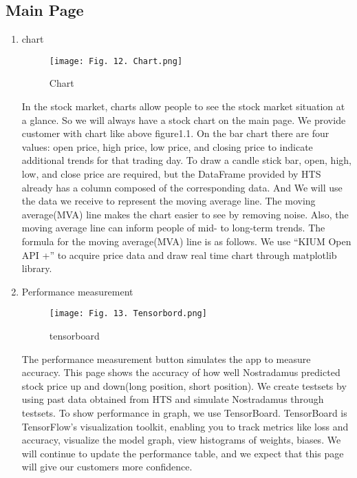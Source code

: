 \documentclass[conference]{IEEEtran}
\begin{document}
\subsection{Main Page}


\begin{enumerate}

 \item chart
    \begin{figure}[h]
    \begin{center}
        \centering
        \texttt{[image: Fig. 12. Chart.png]}
        \caption{Chart}
        \label{fig:my_label}
    \end{center}
    \end{figure}
    
    In the stock market, charts allow people to see the stock market situation at a glance. So we will always have a stock chart on the main page. We provide customer with chart like above figure1.1. On the bar chart there are four values: open price, high price, low price, and closing price to indicate additional trends for that trading day. To draw a candle stick bar, open, high, low, and close price are required, but the DataFrame provided by HTS already has a column composed of the corresponding data. And We will use the data we receive to represent the moving average line. The moving average(MVA) line makes the chart easier to see by removing noise. Also, the moving average line can inform people of mid- to long-term trends. The formula for the moving average(MVA) line is as follows.  We use “KIUM Open API +” to acquire price data and draw real time chart through matplotlib library.
    \vspace{1\baselineskip}
    
     \item Performance measurement
    \begin{figure}[h]
    \begin{center}
        \centering
        \texttt{[image: Fig. 13. Tensorbord.png]}
        \caption{tensorboard}
        \label{fig:my_label}
    \end{center}
    \end{figure}
    
    The performance measurement button simulates the app to measure accuracy. This page shows the accuracy of how well Nostradamus predicted stock price up and down(long position, short position). We create testsets by using past data obtained from HTS and simulate Nostradamus through testsets. To show performance in graph, we use TensorBoard. TensorBoard is TensorFlow’s visualization toolkit, enabling you to track metrics like loss and accuracy, visualize the model graph, view histograms of weights, biases. We will continue to update the performance table, and we expect that this page will give our customers more confidence.\vspace{1\baselineskip}
    

\end{enumerate}
\end{document}
